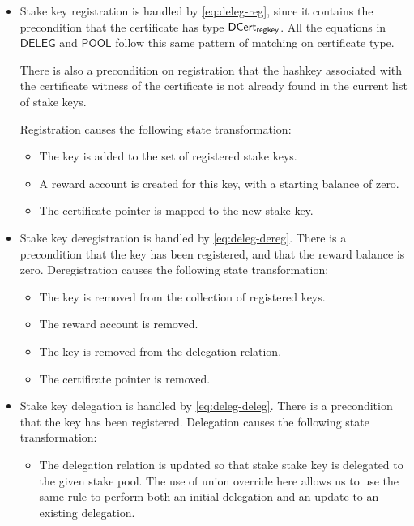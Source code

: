 \begin{itemize}
  \item Stake key registration is handled by \cref{eq:deleg-reg}, since it contains the
    precondition that the certificate has type $\mathsf{DCert_{regkey}}$.
    All the equations in $\mathsf{DELEG}$ and $\mathsf{POOL}$ follow this same pattern of matching
    on certificate type.

    There is also a precondition on registration that the hashkey associated with the certificate
    witness of the certificate is not already found in the current list of stake keys.

    Registration causes the following state transformation:
    \begin{itemize}
      \item The key is added to the set of registered stake keys.
      \item A reward account is created for this key, with a starting balance of zero.
      \item The certificate pointer is mapped to the new stake key.
    \end{itemize}

  \item Stake key deregistration is handled by \cref{eq:deleg-dereg}.
    There is a precondition that the key has been registered, and that the reward balance is zero.
    Deregistration causes the following state transformation:
    \begin{itemize}
      \item The key is removed from the collection of registered keys.
      \item The reward account is removed.
      \item The key is removed from the delegation relation.
      \item The certificate pointer is removed.
    \end{itemize}

  \item Stake key delegation is handled by \cref{eq:deleg-deleg}.
    There is a precondition that the key has been registered.
    Delegation causes the following state transformation:
    \begin{itemize}
      \item The delegation relation is updated so that stake stake key is delegated to the given
        stake pool. The use of union override here allows us to use the same rule
        to perform both an initial delegation and an update to an existing delegation.
    \end{itemize}
\end{itemize}



